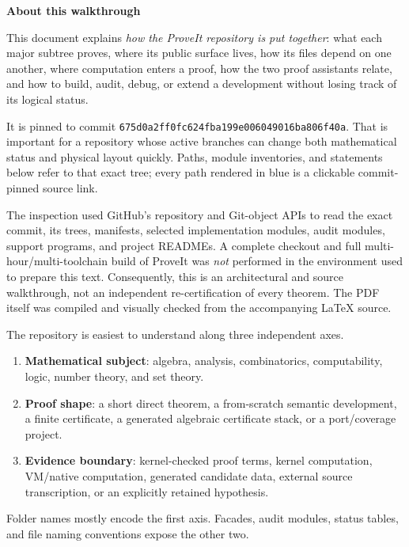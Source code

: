 \documentclass[
  10pt,
  a4paper,
  twoside,
  open=any,
  parskip=half,
  headings=big
]{scrreprt}
\newcommand{\CommitFull}{675d0a2ff0fc624fba199e006049016ba806f40a}
\begin{document}
\cleardoublepage
\thispagestyle{plain}
\begin{center}
{\sffamily\bfseries\Large About this walkthrough}
\end{center}

This document explains \emph{how the ProveIt repository is put together}: what
each major subtree proves, where its public surface lives, how its files depend
on one another, where computation enters a proof, how the two proof assistants
relate, and how to build, audit, debug, or extend a development without losing
track of its logical status.

It is pinned to commit \texttt{\CommitFull}.  That is important for a repository
whose active branches can change both mathematical status and physical layout
quickly.  Paths, module inventories, and statements below refer to that exact
tree; every path rendered in blue is a clickable commit-pinned source link.

The inspection used GitHub's repository and Git-object APIs to read the exact
commit, its trees, manifests, selected implementation modules, audit modules,
support programs, and project READMEs.  A complete checkout and full
multi-hour/multi-toolchain build of ProveIt was \emph{not} performed in the
environment used to prepare this text.  Consequently, this is an architectural
and source walkthrough, not an independent re-certification of every theorem.
The PDF itself was compiled and visually checked from the accompanying
\LaTeX{} source.

\begin{overviewbox}
The repository is easiest to understand along three independent axes.

\begin{enumerate}
  \item \textbf{Mathematical subject}: algebra, analysis, combinatorics,
        computability, logic, number theory, and set theory.
  \item \textbf{Proof shape}: a short direct theorem, a from-scratch semantic
        development, a finite certificate, a generated algebraic certificate
        stack, or a port/coverage project.
  \item \textbf{Evidence boundary}: kernel-checked proof terms, kernel
        computation, VM/native computation, generated candidate data, external
        source transcription, or an explicitly retained hypothesis.
\end{enumerate}

Folder names mostly encode the first axis.  Facades, audit modules, status
tables, and file naming conventions expose the other two.
\end{overviewbox}
\end{document}
